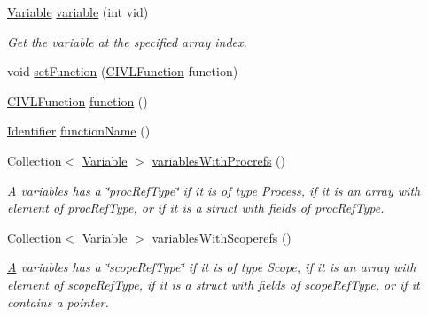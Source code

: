 \begin{DoxyCompactItemize}
\item 
\hyperlink{interfaceedu_1_1udel_1_1cis_1_1vsl_1_1civl_1_1model_1_1IF_1_1variable_1_1Variable}{Variable} \hyperlink{classedu_1_1udel_1_1cis_1_1vsl_1_1civl_1_1model_1_1common_1_1CommonScope_a01a8754d6a65314b8e3bd60bafc6c1ee}{variable} (int vid)
\begin{DoxyCompactList}\small\item\em Get the variable at the specified array index. \end{DoxyCompactList}\item 
void \hyperlink{classedu_1_1udel_1_1cis_1_1vsl_1_1civl_1_1model_1_1common_1_1CommonScope_ab5116f57c718431e2a7fe3268c6a8a5e}{set\+Function} (\hyperlink{interfaceedu_1_1udel_1_1cis_1_1vsl_1_1civl_1_1model_1_1IF_1_1CIVLFunction}{C\+I\+V\+L\+Function} function)
\item 
\hyperlink{interfaceedu_1_1udel_1_1cis_1_1vsl_1_1civl_1_1model_1_1IF_1_1CIVLFunction}{C\+I\+V\+L\+Function} \hyperlink{classedu_1_1udel_1_1cis_1_1vsl_1_1civl_1_1model_1_1common_1_1CommonScope_ab0131f1ca60c7a329a7f426c024678ec}{function} ()
\item 
\hyperlink{interfaceedu_1_1udel_1_1cis_1_1vsl_1_1civl_1_1model_1_1IF_1_1Identifier}{Identifier} \hyperlink{classedu_1_1udel_1_1cis_1_1vsl_1_1civl_1_1model_1_1common_1_1CommonScope_a7c519a6c09b74d554a3ec63b9e3de382}{function\+Name} ()
\item 
Collection$<$ \hyperlink{interfaceedu_1_1udel_1_1cis_1_1vsl_1_1civl_1_1model_1_1IF_1_1variable_1_1Variable}{Variable} $>$ \hyperlink{classedu_1_1udel_1_1cis_1_1vsl_1_1civl_1_1model_1_1common_1_1CommonScope_a97fd823ed81bcb3cba9425b91da886d1}{variables\+With\+Procrefs} ()
\begin{DoxyCompactList}\small\item\em \hyperlink{structA}{A} variables has a \char`\"{}proc\+Ref\+Type\char`\"{} if it is of type Process, if it is an array with element of proc\+Ref\+Type, or if it is a struct with fields of proc\+Ref\+Type. \end{DoxyCompactList}\item 
Collection$<$ \hyperlink{interfaceedu_1_1udel_1_1cis_1_1vsl_1_1civl_1_1model_1_1IF_1_1variable_1_1Variable}{Variable} $>$ \hyperlink{classedu_1_1udel_1_1cis_1_1vsl_1_1civl_1_1model_1_1common_1_1CommonScope_a77ab0f91a69256747c32d769e0194c6f}{variables\+With\+Scoperefs} ()
\begin{DoxyCompactList}\small\item\em \hyperlink{structA}{A} variables has a \char`\"{}scope\+Ref\+Type\char`\"{} if it is of type Scope, if it is an array with element of scope\+Ref\+Type, if it is a struct with fields of scope\+Ref\+Type, or if it contains a pointer. \end{DoxyCompactList}\item 

\end{DoxyCompactItemize}
